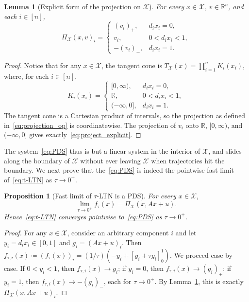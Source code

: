 \documentclass[letterpaper, conference]{ieeeconf}
\newcommand{\R}{\mathbb R}
\newcommand{\X}{\mathcal X}
\newtheorem{lemma}[theorem]{Lemma}
\newtheorem{proposition}[theorem]{Proposition}
\newcommand{\1}{\mathbf{1}}
\begin{document}
\begin{lemma}[Explicit form of the projection on \(\X\)]
\label{lem:projection_formula}
For every \(x\in\X\), \(v\in\R^n\), and each \(i \in [n]\),
\begin{equation}\label{eq:project_explicit}
    \Pi_{\X}(x,v)_i=
    \begin{cases}
    (v_i)_+, & d_ix_i=0,\\
    v_i, & 0<d_i x_i<1,\\
    -(v_i)_-, & d_i x_i=1.
    \end{cases}
\end{equation}
\end{lemma}
\begin{proof}
Notice that for any \(x\in\X\), the tangent cone is \(T_{\X}(x)=\prod_{i=1}^n K_i(x_i)\), where, for each \(i \in [n]\),
\[
K_i(x_i)=
\begin{cases}
[0,\infty), & d_ix_i=0,\\
\R, & 0<d_i x_i<1,\\
(-\infty,0], & d_i x_i=1.
\end{cases}
\]
The tangent cone is a Cartesian product of intervals, so the projection as defined in~\eqref{eq:projection_op} is coordinatewise. The projection of \(v_i\) onto \(\R\), \([0,\infty)\), and \((-\infty,0]\) gives exactly~\eqref{eq:project_explicit}.
\end{proof}

The system~\eqref{eq:PDS} thus is but a linear system in the interior of \(\X\), and slides along the boundary of \(\X\) without ever leaving \(\X\) when trajectories hit the boundary. 
We next prove that the~\eqref{eq:PDS} is indeed the pointwise fast limit of~\eqref{eq:t-LTN} as \(\tau \to 0^+\).

\begin{proposition}[Fast limit of $\tau$-LTN is a PDS]
\label{prop:fast_limit}
For every \(x\in\X\),
\[
\lim_{\tau\to 0^+} f_\tau(x)=\Pi_{\X}(x,Ax+u).
\]
Hence~\eqref{eq:t-LTN} converges pointwise to~\eqref{eq:PDS} as \(\tau\to0^+\).
\end{proposition}
\begin{proof}
For any \(x\in\X\), consider an arbitrary component $i$ and let \(y_i=d_i x_i\in[0,1]\) and \(g_i=(Ax+u)_i\). 
Then \(f_{\tau,i}(x) \coloneqq (f_{\tau}(x))_i=(1/\tau)\left(-y_i+[y_i+\tau g_i]_0^1\right)
\).
We proceed case by case.
If \(0<y_i<1\), then \(f_{\tau,i}(x)\to g_i\); 
if \(y_i=0\), then \(f_{\tau,i}(x)\to(g_i)_+\); 
if \(y_i=1\), then \(f_{\tau,i}(x)\to -(g_i)_-\), each for \(\tau \to 0^+\).
By Lemma~\ref{lem:projection_formula}, this is exactly \(\Pi_{\X}(x,Ax+u)_i\).
\end{proof}
\end{document}
